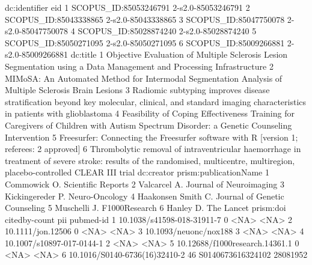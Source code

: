 \begin{Schunk}
\begin{Soutput}
          dc:identifier                eid
1 SCOPUS_ID:85053246791 2-s2.0-85053246791
2 SCOPUS_ID:85043338865 2-s2.0-85043338865
3 SCOPUS_ID:85047750078 2-s2.0-85047750078
4 SCOPUS_ID:85028874240 2-s2.0-85028874240
5 SCOPUS_ID:85050271095 2-s2.0-85050271095
6 SCOPUS_ID:85009266881 2-s2.0-85009266881
                                                                                                                                                                     dc:title
1                                                        Objective Evaluation of Multiple Sclerosis Lesion Segmentation using a Data Management and Processing Infrastructure
2                                                                        MIMoSA: An Automated Method for Intermodal Segmentation Analysis of Multiple Sclerosis Brain Lesions
3                       Radiomic subtyping improves disease stratification beyond key molecular, clinical, and standard imaging characteristics in patients with glioblastoma
4                                    Feasibility of Coping Effectiveness Training for Caregivers of Children with Autism Spectrum Disorder: a Genetic Counseling Intervention
5                                                                                     Freesurfer: Connecting the Freesurfer software with R [version 1; referees: 2 approved]
6 Thrombolytic removal of intraventricular haemorrhage in treatment of severe stroke: results of the randomised, multicentre, multiregion, placebo-controlled CLEAR III trial
          dc:creator         prism:publicationName
1       Commowick O.            Scientific Reports
2       Valcarcel A.       Journal of Neuroimaging
3   Kickingereder P.                Neuro-Oncology
4 Haakonsen Smith C. Journal of Genetic Counseling
5       Muschelli J.                 F1000Research
6          Hanley D.                    The Lancet
                       prism:doi citedby-count               pii pubmed-id
1     10.1038/s41598-018-31911-7             0              <NA>      <NA>
2              10.1111/jon.12506             0              <NA>      <NA>
3          10.1093/neuonc/nox188             3              <NA>      <NA>
4      10.1007/s10897-017-0144-1             2              <NA>      <NA>
5 10.12688/f1000research.14361.1             0              <NA>      <NA>
6  10.1016/S0140-6736(16)32410-2            46 S0140673616324102  28081952
\end{Soutput}
\end{Schunk}

